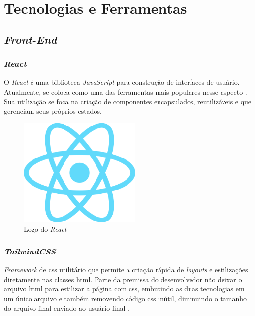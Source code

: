 \section{Tecnologias e Ferramentas} 

\subsection{\emph{Front-End}} 

\subsubsection{\emph{React}} 
O \emph{React} \cite{react} é uma biblioteca \emph{JavaScript} para construção de interfaces de usuário. Atualmente, se coloca como uma das ferramentas mais populares nesse aspecto \cite{state-of-front-end}. Sua utilização se foca na criação de componentes encapsulados, reutilizáveis e que gerenciam seus próprios estados.

\begin{figure}[htb]
	\centering
	\includegraphics[width=6cm]{cap04-desenvolvimento/images/4-4-1-1-react}
	\caption{Logo do \emph{React}}
	\label{fig:logo_react}
\end{figure}

\subsubsection{\emph{TailwindCSS}} 
\emph{Framework} de \gls{css} utilitário que permite a criação rápida de \emph{layouts} e estilizações diretamente nas classes \gls{html}. Parte da premissa do desenvolvedor não deixar o arquivo \gls{html} para estilizar a página com \gls{css}, embutindo as duas tecnologias em um único arquivo e também removendo código \gls{css} inútil, diminuindo o tamanho do arquivo final enviado ao usuário final \cite{tailwind}.

